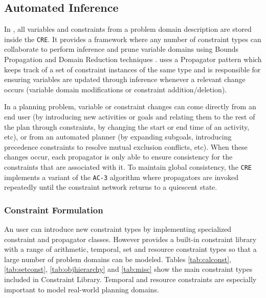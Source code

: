 \subsection{Automated Inference}
\label{sec:europa:inference}

In \eue, all variables and constraints from a problem domain
description are stored inside the \texttt{CRE}.  It provides a
framework where any number of constraint types can collaborate to
perform inference and prune variable domains using Bounds Propagation
and Domain Reduction techniques \cite{marriott98}.  \eu uses a
Propagator pattern which keeps track of a set of constraint instances
of the same type and is responsible for ensuring variables are updated
through inference whenever a relevant change occurs (variable domain
modifications or constraint addition/deletion).

In a planning problem, variable or constraint changes can come
directly from an end user (by introducing new activities or goals and
relating them to the rest of the plan through constraints, by changing
the start or end time of an activity, etc), or from an automated
planner (by expanding subgoals, introducing precedence constraints to
resolve mutual exclusion conflicts, etc). When these changes occur,
each propagator is only able to ensure consistency for the constraints
that are associated with it.  To maintain global consistency, the
\texttt{CRE} implements a variant of the \texttt{AC-3} algorithm
\cite{mackworth77} where propagators are invoked repeatedly until the
constraint network returns to a quiescent state.



\subsubsection{Constraint Formulation}
\label{sec:europa:constraints}

An \eu user can introduce new constraint types by implementing
specialized constraint and propagator classes. However \eu provides a
built-in constraint library with a range of arithmetic, temporal, set
and resource constraint types so that a large number of problem
domains can be modeled. Tables \ref{tab:calconst}, \ref{tab:setconst},
\ref{tab:objhierarchy} and \ref{tab:misc} show the main constraint
types included in \eus Constraint Library.  Temporal and resource
constraints are especially important to model real-world planning
domains.

